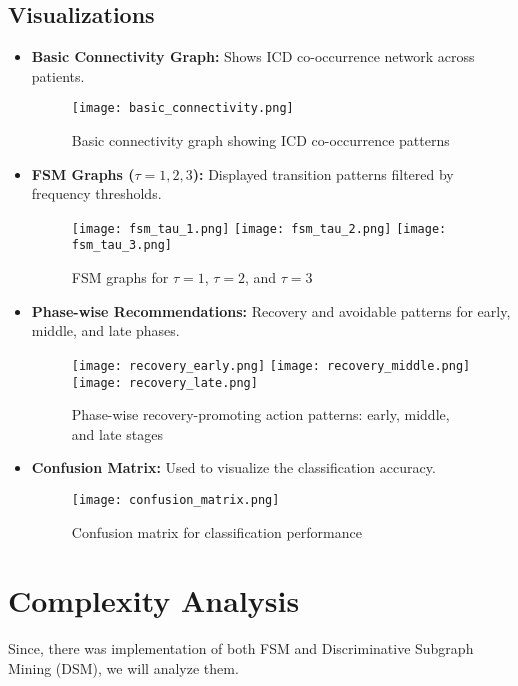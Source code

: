 \documentclass[10pt]{article}
\begin{document}
\subsection*{Visualizations}
\begin{itemize}[noitemsep]
    \item \textbf{Basic Connectivity Graph:} Shows ICD co-occurrence network across patients.
    \begin{figure}[H]
        \centering
        \texttt{[image: basic\_connectivity.png]}
        \caption{Basic connectivity graph showing ICD co-occurrence patterns}
    \end{figure}

    \item \textbf{FSM Graphs (\(\tau = 1,2,3\)):} Displayed transition patterns filtered by frequency thresholds.
    \begin{figure}[H]
        \centering
        \texttt{[image: fsm\_tau\_1.png]}
        \texttt{[image: fsm\_tau\_2.png]}
        \texttt{[image: fsm\_tau\_3.png]}
        \caption{FSM graphs for $\tau=1$, $\tau=2$, and $\tau=3$}
    \end{figure}


    \item \textbf{Phase-wise Recommendations:} Recovery and avoidable patterns for early, middle, and late phases.
    \begin{figure}[H]
        \centering
        \texttt{[image: recovery\_early.png]}
        \texttt{[image: recovery\_middle.png]}
        \texttt{[image: recovery\_late.png]}
        \caption{Phase-wise recovery-promoting action patterns: early, middle, and late stages}
    \end{figure}

    \item \textbf{Confusion Matrix:} Used to visualize the classification accuracy.
    \begin{figure}[H]
        \centering
        \texttt{[image: confusion\_matrix.png]}
        \caption{Confusion matrix for classification performance}
    \end{figure}
\end{itemize}

\section{Complexity Analysis}
Since, there was implementation of both FSM and Discriminative Subgraph Mining (DSM), we will analyze them.
\end{document}
